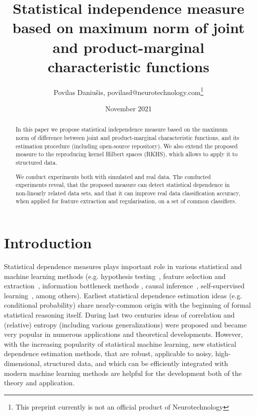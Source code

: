 \documentclass{article}
\title{Statistical independence measure based on maximum norm of joint and product-marginal characteristic functions}
\author{Povilas Daniu\v{s}is, povilasd@neurotechnology.com\footnote{This preprint currently is not an official product of Neurotechnology}}
\date{November 2021}
\begin{document}
\maketitle

%

\begin{abstract}
    In this paper we propose statistical independence measure based on the maximum norm of difference between joint and product-marginal characteristic functions, and its estimation procedure (including open-source repository). We also extend the proposed measure to the reproducing kernel Hilbert spaces (RKHS), which allows to apply it to structured data.
    
    We conduct experiments both with simulated and real data. The conducted experiments reveal, that the proposed measure can detect statistical dependence in non-linearly related data sets, and that it can improve real data classification accuracy, when applied for feature extraction and regularisation, on a set of common classifiers.
    
\end{abstract}

\section{Introduction}
Statistical dependence measures plays important role in various statistical and machine learning methods (e.g. hypothesis testing~\cite{Gretton2005MeasuringSD}, feature selection and extraction~\cite{EigenHSIC,HSCA}, information bottleneck methods \cite{Ma2020TheHB}, causal inference~\cite{NIPS2008_f7664060}, self-supervised learning~\cite{li2021selfsupervised}, among others).  Earliest statistical dependence estimation ideas (e.g. conditional probability) share nearly-common origin with the beginning of formal statistical reasoning itself. During last two centuries ideas of correlation and (relative) entropy (including various generalizations) were proposed and became very popular in numerous applications and theoretical developments. However, with the increasing popularity of statistical machine learning, new statistical dependence estimation methods, that are robust, applicable to noisy, high-dimensional, structured data, and which can be efficiently integrated with modern machine learning methods are helpful for the development both of the theory and application.
\end{document}
